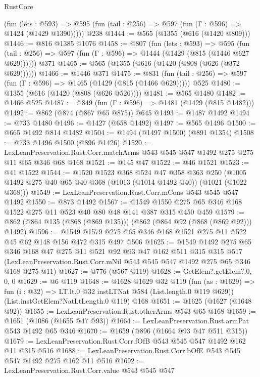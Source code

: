 \begin{lexlean}{RustCore}
\begin{coremodule}
      (fun (lets : @593) =>
      @595 (fun (tail : @256) => @597 (fun (Γ : @596) => @1424 (@1429 @1390)))))
    @238
@1444 := @565 (@1355 (@616 (@1420 @809)))
@1446 := @816 @1385 @1076
@1458 := @807
    (fun (lets : @593) =>
    @595 (fun (tail : @256) => @597 (fun (Γ : @596) => @1444 (@1429 (@815 (@1446 @627 @629))))))
    @371
@1465 := @565 (@1355 (@616 (@1420 (@808 (@626 (@372 @629))))))
@1466 := @1446 @371
@1475 := @831 (fun (tail : @256) => @597 (fun (Γ : @596) => @1465 (@1429 (@815 (@1466 @629))))) @525
@1480 := @1355 (@616 (@1420 (@808 (@626 @526))))
@1481 := @565 @1480
@1482 := @1466 @525
@1487 := @849 (fun (Γ : @596) => @1481 (@1429 (@815 @1482)))
@1492 := @862 (@874 (@867 @65 @875)) @645
@1493 := @1487 @1492
@1494 := @733 @1480
@1496 := @1427 (@658 @1492)
@1497 := @565 @1496
@1500 := @665 @1492 @814 @1482
@1504 := @1494 (@1497 @1500) (@891 @1354)
@1508 := @733 @1496 @1500 (@896 @1426)
@1520 := LexLeanPreservation.Rust.Corr.matchArms
    @543
    @545
    @547
    @1492
    @275
    @275
    @11
    @65
    @346
    @68
    @168
@1521 := @145 @47
@1522 := @46 @1521
@1523 := @41 @1522
@1544 := @1520
    @1523
    @368
    @524
    @47
    @358
    @363
    @250
    (@1005 @1492 @275 @40 @65 @40 @368 (@1013 (@1014 @1492 @40)) (@1021 (@1022 @368)))
@1549 := LexLeanPreservation.Rust.Corr.mCons @543 @545 @547 @1492
@1550 := @873 @1492
@1567 := @1549 @1550 @275 @65 @346 @168 @1522 @275 @11 @523 @40 @80 @48 @141 @387 @315 @450 @459
@1579 := @862 (@864 @135 (@868 (@869 @135))) (@862 (@864 @92 (@868 (@869 @92))) @1492)
@1596 := @1549 @1579 @275 @65 @346 @168 @1521 @275 @11 @522 @45 @62 @148 @156 @472 @315 @497 @506
@1625 := @1549
    @1492
    @275
    @65
    @346
    @168
    @47
    @275
    @11
    @521
    @92
    @93
    @47
    @162
    @511
    @315
    @315
    @517
    (LexLeanPreservation.Rust.Corr.mNil @543 @545 @547 @1492 @275 @65 @346 @168 @275 @11)
@1627 := @776 (@567 @119)
@1628 := GetElem?.getElem?.{0, 0, 0}
@1629 := @6 @119
@1648 := @1628
    @1629
    @32
    @119
    (fun (as : @1629) => fun (i : @32) => LT.lt.{0} @32 instLTNat @584 (List.length.{0} @119 @629))
    (List.instGetElem?NatLtLength.{0} @119)
    @168
@1651 := @1625 (@1627 (@1648 @92))
@1655 := LexLeanPreservation.Rust.otherArms @543 @65 @168
@1659 := @1651 (@1086 (@1655 @47 @93))
@1664 := LexLeanPreservation.Rust.armPat @543 @1492 @65 @346
@1670 := @1659 (@896 (@1664 @93 @47 @511 @315))
@1679 := LexLeanPreservation.Rust.Corr.fOfB @543 @545 @547 @1492 @162 @11 @315 @516
@1688 := LexLeanPreservation.Rust.Corr.bOfE @543 @545 @547 @1492 @275 @162 @11 @516
@1692 := LexLeanPreservation.Rust.Corr.value @543 @545 @547

\end{coremodule}
\end{lexlean}
